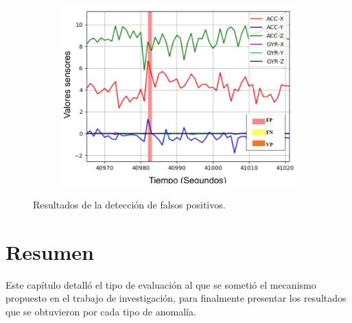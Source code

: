 \begin{figure}[H]
{\begin{varwidth}{\textwidth}
\begin{subfigure}[h]{0.45\textwidth}
            \includegraphics[width=\textwidth]{imagenes/Cap5/fp3}
        \end{subfigure} 
        \end{varwidth}}
        \caption{Resultados de la detecci\'{o}n de falsos positivos.}
		\label{fig:resultados_falsos_positivos}
    \end{figure}

\section{Resumen}

Este cap\'{i}tulo detall\'{o} el tipo de evaluaci\'{o}n al que se someti\'{o} el mecanismo propuesto en el trabajo de investigaci\'{o}n, para finalmente presentar los resultados que se obtuvieron por cada tipo de anomal\'{i}a.
 
 